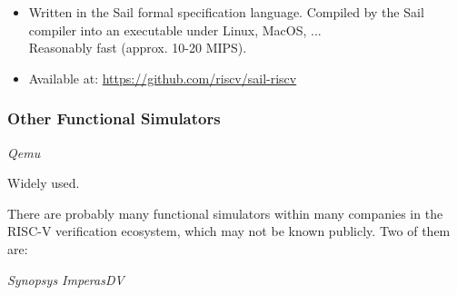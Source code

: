 \begin{frame}[fragile]
{\begin{minipage}{0.7\textwidth}
\begin{itemize}
      \item Written in the Sail formal specification language.  Compiled
        by the Sail compiler into an executable under Linux, MacOS, ... \\
        Reasonably fast (approx. 10-20 MIPS).

      \item Available at: \url{https://github.com/riscv/sail-riscv}
    \end{itemize}
  \end{minipage}
}

\end{frame}


\begin{frame}[fragile]
\frametitle{Other Functional Simulators}

\footnotesize

\begin{minipage}{0.2\textwidth}
  \emph{Qemu}

  \vx

  Widely used.
\end{minipage}
\hm{}

\vxx


There are probably many functional simulators within many companies in
the RISC-V verification ecosystem, which may not be known
publicly. Two of them are:

\vx

\begin{minipage}{0.2\textwidth}
  \emph{Synopsys ImperasDV}

  \vx


\end{minipage}
\end{frame}
